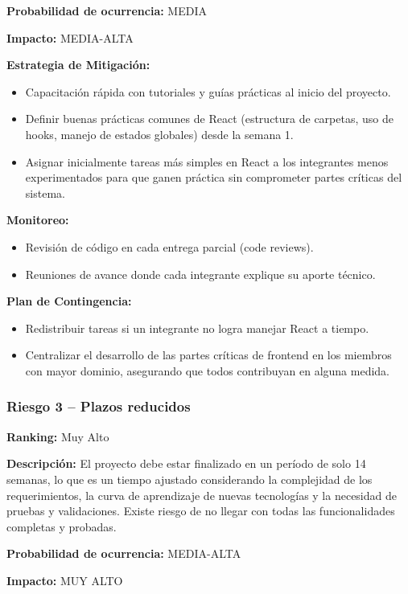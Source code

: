 \textbf{Probabilidad de ocurrencia:} MEDIA

\textbf{Impacto:} MEDIA-ALTA

\textbf{Estrategia de Mitigación:}
\begin{itemize}
    \item Capacitación rápida con tutoriales y guías prácticas al inicio del proyecto.
    \item Definir buenas prácticas comunes de React (estructura de carpetas, uso de hooks, manejo de estados globales) desde la semana 1.
    \item Asignar inicialmente tareas más simples en React a los integrantes menos experimentados para que ganen práctica sin comprometer partes críticas del sistema.
\end{itemize}

\textbf{Monitoreo:}
\begin{itemize}
    \item Revisión de código en cada entrega parcial (code reviews).
    \item Reuniones de avance donde cada integrante explique su aporte técnico.
\end{itemize}

\textbf{Plan de Contingencia:}
\begin{itemize}
    \item Redistribuir tareas si un integrante no logra manejar React a tiempo.
    \item Centralizar el desarrollo de las partes críticas de frontend en los miembros con mayor dominio, asegurando que todos contribuyan en alguna medida.
\end{itemize}

\subsubsection{Riesgo 3 -- Plazos reducidos}

\textbf{Ranking:} Muy Alto

\textbf{Descripción:} El proyecto debe estar finalizado en un período de solo 14 semanas, lo que es un tiempo ajustado considerando la complejidad de los requerimientos, la curva de aprendizaje de nuevas tecnologías y la necesidad de pruebas y validaciones. Existe riesgo de no llegar con todas las funcionalidades completas y probadas.

\textbf{Probabilidad de ocurrencia:} MEDIA-ALTA

\textbf{Impacto:} MUY ALTO

